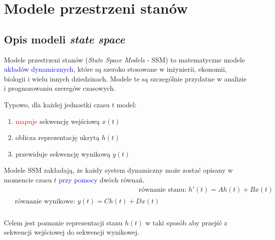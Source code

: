 \documentclass[data-science]{agh-wi} %
\begin{document}

\section{Modele przestrzeni stanów}
\subsection{Opis modeli \textit{state space}}
Modele przestrzeni stanów (\textit{State Space Models} - SSM) to matematyczne modele \textcolor{blue}{układów dynamicznych}, które są szeroko stosowane w inżynierii, ekonomii, biologii i wielu innych dziedzinach. Modele te są szczególnie przydatne w analizie i prognozowaniu szeregów czasowych.

\noindent Typowo, dla każdej jednostki czasu $t$ model:
\begin{enumerate}
    \item \textcolor{red}{mapuje} sekwencję wejściową $x(t)$
    \item oblicza reprezentację ukrytą $h(t)$
    \item przewiduje sekwencję wynikową $y(t)$
\end{enumerate}

Modele SSM zakładają, że każdy system dynamiczny może zostać opisany w momencie czasu $t$ \textcolor{blue}{przy pomocy} dwóch równań.
\begin{align}
     & \text{równanie stanu: } h'(t) = Ah(t) + Bx(t) \label{equ:rownanie_stanu} \\
    \begin{split}
        &\text{równanie wynikowe: } y(t) = Ch(t) + Dx(t) \label{equ:rownanie_wynikowe} \\
    \end{split}
\end{align}

Celem jest poznanie reprezentacji stanu $h(t)$ w taki sposób aby przejść z sekwencji wejściowej do sekwencji wynikowej.
\end{document}
